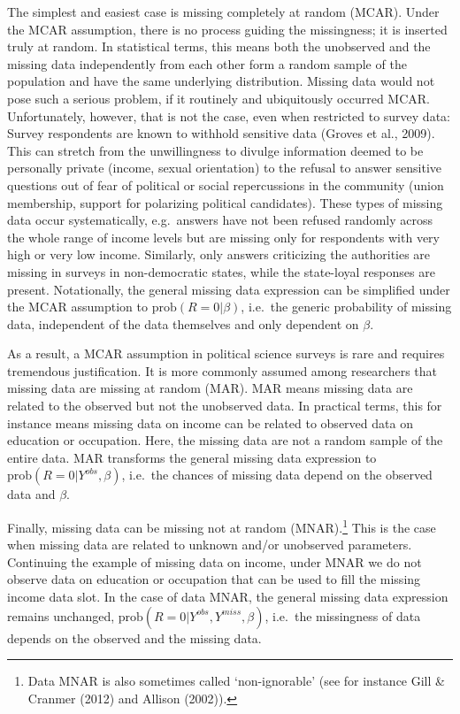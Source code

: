\documentclass[12pt,econ]{sources/authesis}
\begin{document}
The simplest and easiest case is missing completely at random (MCAR). Under the MCAR assumption, there is no process guiding the missingness; it is inserted truly at random. In statistical terms, this means both the unobserved and the missing data independently from each other form a random sample of the population and have the same underlying distribution. Missing data would not pose such a serious problem, if it routinely and ubiquitously occurred MCAR. Unfortunately, however, that is not the case, even when restricted to survey data: Survey respondents are known to withhold sensitive data (Groves et al., 2009). This can stretch from the unwillingness to divulge information deemed to be personally private (income, sexual orientation) to the refusal to answer sensitive questions out of fear of political or social repercussions in the community (union membership, support for polarizing political candidates). These types of missing data occur systematically, e.g.~answers have not been refused randomly across the whole range of income levels but are missing only for respondents with very high or very low income. Similarly, only answers criticizing the authorities are missing in surveys in non-democratic states, while the state-loyal responses are present. Notationally, the general missing data expression can be simplified under the MCAR assumption to \(\text{prob}(R = 0 | \beta)\), i.e.~the generic probability of missing data, independent of the data themselves and only dependent on \(\beta\).

As a result, a MCAR assumption in political science surveys is rare and requires tremendous justification. It is more commonly assumed among researchers that missing data are missing at random (MAR). MAR means missing data are related to the observed but not the unobserved data. In practical terms, this for instance means missing data on income can be related to observed data on education or occupation. Here, the missing data are not a random sample of the entire data. MAR transforms the general missing data expression to \(\text{prob}(R = 0 | Y^{obs}, \beta)\), i.e.~the chances of missing data depend on the observed data and \(\beta\).

Finally, missing data can be missing not at random (MNAR).\footnote{Data MNAR is also sometimes called `non-ignorable' (see for instance Gill \& Cranmer (2012) and Allison (2002)).} This is the case when missing data are related to unknown and/or unobserved parameters. Continuing the example of missing data on income, under MNAR we do not observe data on education or occupation that can be used to fill the missing income data slot. In the case of data MNAR, the general missing data expression remains unchanged, \(\text{prob}(R = 0 | Y^{obs}, Y^{miss}, \beta)\), i.e.~the missingness of data depends on the observed and the missing data.
\end{document}
